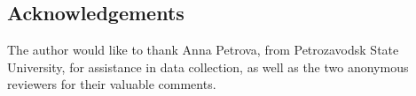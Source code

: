 \documentclass[output=paper]{langsci/langscibook}
\begin{document}
% 
% 
% 
% 
% 
% 
% 
% 
% 
% 
% 
% 
% 
% 
% 
% 
% 
% 
% 
% 
% 
% 
% 
% 
% 
% 
% 
% 
% 
% 
% 
% 
% 
% 
% 
% 


\subsection*{Acknowledgements}
The author would like to thank Anna Petrova, from Petrozavodsk State University, for assistance in data collection, as well as the two anonymous reviewers for their valuable comments.
\printbibliography[heading=subbibliography,notkeyword=this]
\end{document}

